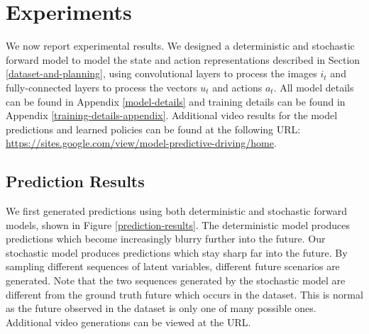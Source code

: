 \documentclass{article} %
\begin{document}
\section{Experiments}
\label{experiments}

We now report experimental results. We designed a deterministic and stochastic forward model to model the state and action representations described in Section \ref{dataset-and-planning}, using convolutional layers to process the images $i_t$ and fully-connected layers to process the vectors $u_t$ and actions $a_t$. All model details can be found in Appendix \ref{model-details} and training details can be found in Appendix \ref{training-details-appendix}.
Additional video results for the model predictions and learned policies can be found at the following URL: \url{https://sites.google.com/view/model-predictive-driving/home}.


    \subsection{Prediction Results}


    We first generated predictions using both deterministic and stochastic forward models, shown in  Figure \ref{prediction-results}.
    The deterministic model produces predictions which become increasingly blurry further into the future. Our stochastic model produces predictions which stay sharp far into the future.
    By sampling different sequences of latent variables, different future scenarios are generated.
    Note that the two sequences generated by the stochastic model are different from the ground truth future which occurs in the dataset.
    This is normal as the future observed in the dataset is only one of many possible ones.
    Additional video generations can be viewed at the URL. 
\end{document}
